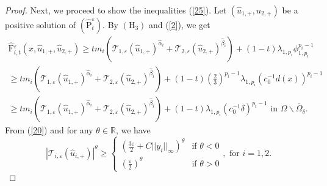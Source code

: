 \documentclass[11pt]{amsart}
\theoremstyle{definition}
\theoremstyle{remark}
\numberwithin{equation}{section}
\begin{document}
\begin{proof}
Next, we proceed to show the inequalities (\ref{25}). Let $(\hat{u}_{1,+}, 
\hat{u}_{2,+})$ be a positive solution of $(\widehat{\mathrm{P}}
_{t}^{\varepsilon }).$ By $(\mathrm{H}_{3})$ and (\ref{2}), we get 
\begin{equation}
\begin{array}{l}
\widehat{\mathrm{F}}{_{i,t}^{\varepsilon }}({x,}\hat{u}_{1,+},\hat{u}
_{2,+})\geq tm_{i}(\mathcal{T}_{1,\varepsilon }(\hat{u}_{1,+})^{\hat{\alpha}
_{i}}+\mathcal{T}_{2,\varepsilon }(\hat{u}_{2,+})^{\hat{\beta}
_{i}})+(1-t)\lambda _{1,p_{i}}\phi _{1,p_{i}}^{p_{i}-1} \\ 
\geq tm_{i}(\mathcal{T}_{1,\varepsilon }(\hat{u}_{1,+})^{\hat{\alpha}_{i}}+ 
\mathcal{T}_{2,\varepsilon }(\hat{u}_{2,+})^{\hat{\beta}_{i}})+(1-t)(\frac{2 
}{3})^{p_{i}-1}\lambda _{1,p_{i}}(c_{0}^{-1}d(x))^{p_{i}-1} \\ 
\geq tm_{i}(\mathcal{T}_{1,\varepsilon }(\hat{u}_{1,+})^{\hat{\alpha}_{i}}+ 
\mathcal{T}_{2,\varepsilon }(\hat{u}_{2,+})^{\hat{\beta}_{i}})+(1-t)\lambda
_{1,p_{i}}(c_{0}^{-1}\delta )^{p_{i}-1}\text{\ in\ }\Omega \backslash 
\overline{\Omega }_{\delta }.%
\end{array}
\label{26}
\end{equation}
From (\ref{20}) and for any $\theta \in 
\mathbb{R}
$, we have 
\begin{equation*}
|\mathcal{T}_{i,\varepsilon }(\hat{u}_{i,+})|^{\theta }\geq \left\{ 
\begin{array}{ll}
(\frac{3\varepsilon }{2}+C||y_{i}||_{\infty })^{\theta } & \text{if }\theta
<0 \\ 
(\frac{\varepsilon }{2})^{\theta } & \text{if }\theta >0%
\end{array}
\right. ,\text{ for }i=1,2.
\end{equation*}


\end{proof}
\end{document}
